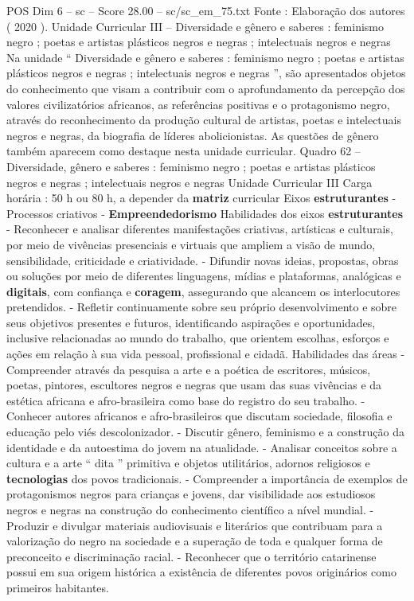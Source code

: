 \begin{textsample}{POS Dim 6 – sc – Score 28.00 – sc/sc\_em\_75.txt}
Fonte : Elaboração dos autores ( 2020 ).
Unidade Curricular III – Diversidade e gênero e saberes : feminismo negro ; poetas e artistas plásticos negros e negras ; intelectuais negros e negras Na unidade “ Diversidade e gênero e saberes : feminismo negro ; poetas e artistas plásticos negros e negras ; intelectuais negros e negras ”, são apresentados objetos do conhecimento que visam a contribuir com o aprofundamento da percepção dos valores civilizatórios africanos, as referências positivas e o protagonismo negro, através do reconhecimento da produção cultural de artistas, poetas e intelectuais negros e negras, da biografia de líderes abolicionistas.
As questões de gênero também aparecem como destaque nesta unidade curricular.
Quadro 62 – Diversidade, gênero e saberes : feminismo negro ; poetas e artistas plásticos negros e negras ; intelectuais negros e negras Unidade Curricular III Carga horária : 50 h ou 80 h, a depender da \textbf{matriz} curricular Eixos \textbf{estruturantes} - Processos criativos - \textbf{Empreendedorismo} Habilidades dos eixos \textbf{estruturantes} - Reconhecer e analisar diferentes manifestações criativas, artísticas e culturais, por meio de vivências presenciais e virtuais que ampliem a visão de mundo, sensibilidade, criticidade e criatividade. - Difundir novas ideias, propostas, obras ou soluções por meio de diferentes linguagens, mídias e plataformas, analógicas e \textbf{digitais}, com confiança e \textbf{coragem}, assegurando que alcancem os interlocutores pretendidos. - Refletir continuamente sobre seu próprio desenvolvimento e sobre seus objetivos presentes e futuros, identificando aspirações e oportunidades, inclusive relacionadas ao mundo do trabalho, que orientem escolhas, esforços e ações em relação à sua vida pessoal, profissional e cidadã.
Habilidades das áreas - Compreender através da pesquisa a arte e a poética de escritores, músicos, poetas, pintores, escultores negros e negras que usam das suas vivências e da estética africana e afro-brasileira como base do registro do seu trabalho. - Conhecer autores africanos e afro-brasileiros que discutam sociedade, filosofia e educação pelo viés descolonizador. - Discutir gênero, feminismo e a construção da identidade e da autoestima do jovem na atualidade. - Analisar conceitos sobre a cultura e a arte “ dita ” primitiva e objetos utilitários, adornos religiosos e \textbf{tecnologias} dos povos tradicionais. - Compreender a importância de exemplos de protagonismos negros para crianças e jovens, dar visibilidade aos estudiosos negros e negras na construção do conhecimento científico a nível mundial. - Produzir e divulgar materiais audiovisuais e literários que contribuam para a valorização do negro na sociedade e a superação de toda e qualquer forma de preconceito e discriminação racial. - Reconhecer que o território catarinense possui em sua origem histórica a existência de diferentes povos originários como primeiros habitantes.

\end{textsample}
